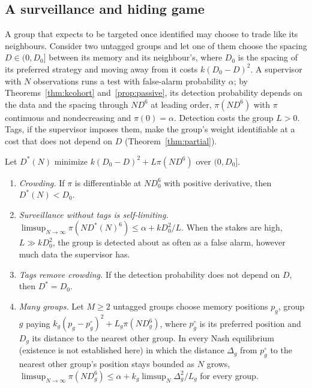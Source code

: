 \subsection{A surveillance and hiding game}

A group that expects to be targeted once identified may choose to trade like its neighbours. Consider two untagged groups and let one of them choose the spacing $D\in(0,D_0]$ between its memory and its neighbour's, where $D_0$ is the spacing of its preferred strategy and moving away from it costs $k(D_0-D)^2$. A supervisor with $N$ observations runs a test with false-alarm probability $\alpha$; by Theorems~\ref{thm:kcohort} and~\ref{prop:passive}, its detection probability depends on the data and the spacing through $ND^6$ at leading order, $\pi(ND^6)$ with $\pi$ continuous and nondecreasing and $\pi(0)=\alpha$. Detection costs the group $L>0$. Tags, if the supervisor imposes them, make the group's weight identifiable at a cost that does not depend on $D$ (Theorem~\ref{thm:partial}).

\begin{proposition}\label{prop:hidegame}
Let $D^*(N)$ minimize $k(D_0-D)^2+L\pi(ND^6)$ over $(0,D_0]$.
\begin{enumerate}[label=(\roman*),itemsep=1pt]
\item \emph{Crowding.} If $\pi$ is differentiable at $ND_0^6$ with positive derivative, then $D^*(N)<D_0$.
\item \emph{Surveillance without tags is self-limiting.} $\limsup_{N\to\infty}\pi(ND^*(N)^6)\le\alpha+kD_0^2/L$. When the stakes are high, $L\gg kD_0^2$, the group is detected about as often as a false alarm, however much data the supervisor has.
\item \emph{Tags remove crowding.} If the detection probability does not depend on $D$, then $D^*=D_0$.
\item \emph{Many groups.} Let $M\ge2$ untagged groups choose memory positions $p_g$, group $g$ paying $k_g(p_g-p^\circ_g)^2+L_g\pi(ND_g^6)$, where $p^\circ_g$ is its preferred position and $D_g$ its distance to the nearest other group. In every Nash equilibrium (existence is not established here) in which the distance $\Delta_g$ from $p^\circ_g$ to the nearest other group's position stays bounded as $N$ grows, $\limsup_{N\to\infty}\pi(ND_g^6)\le\alpha+k_g\limsup_N\Delta_g^2/L_g$ for every group.
\end{enumerate}
\end{proposition}

